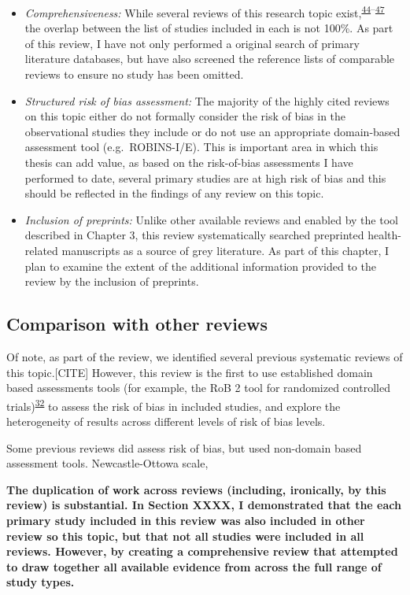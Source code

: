 \documentclass[a4paper, twoside]{templates/ociamthesis}
\providecommand{\tightlist}{%
  \setlength{\itemsep}{0pt}\setlength{\parskip}{0pt}}
\begin{document}
\begin{itemize}
\tightlist
\item
  \emph{Comprehensiveness:} While several reviews of this research topic exist,\textsuperscript{\protect\hyperlink{ref-chu2018b}{44}--\protect\hyperlink{ref-poly2020b}{47}} the overlap between the list of studies included in each is not 100\%. As part of this review, I have not only performed a original search of primary literature databases, but have also screened the reference lists of comparable reviews to ensure no study has been omitted.
\item
  \emph{Structured risk of bias assessment:} The majority of the highly cited reviews on this topic either do not formally consider the risk of bias in the observational studies they include or do not use an appropriate domain-based assessment tool (e.g.~ROBINS-I/E). This is important area in which this thesis can add value, as based on the risk-of-bias assessments I have performed to date, several primary studies are at high risk of bias and this should be reflected in the findings of any review on this topic.
\item
  \emph{Inclusion of preprints:} Unlike other available reviews and enabled by the tool described in Chapter 3, this review systematically searched preprinted health-related manuscripts as a source of grey literature. As part of this chapter, I plan to examine the extent of the additional information provided to the review by the inclusion of preprints.
\end{itemize}

\hypertarget{comparison-with-other-reviews}{%
\subsection{Comparison with other reviews}\label{comparison-with-other-reviews}}

Of note, as part of the review, we identified several previous systematic reviews of this topic.{[}CITE{]} However, this review is the first to use established domain based assessments tools (for example, the RoB 2 tool for randomized controlled trials)\textsuperscript{\protect\hyperlink{ref-sterne2019}{32}} to assess the risk of bias in included studies, and explore the heterogeneity of results across different levels of risk of bias levels.

Some previous reviews did assess risk of bias, but used non-domain based assessment tools. Newcastle-Ottowa scale,

\textbf{The duplication of work across reviews (including, ironically, by this review) is substantial. In Section XXXX, I demonstrated that the each primary study included in this review was also included in other review so this topic, but that not all studies were included in all reviews. However, by creating a comprehensive review that attempted to draw together all available evidence from across the full range of study types.}
\end{document}
